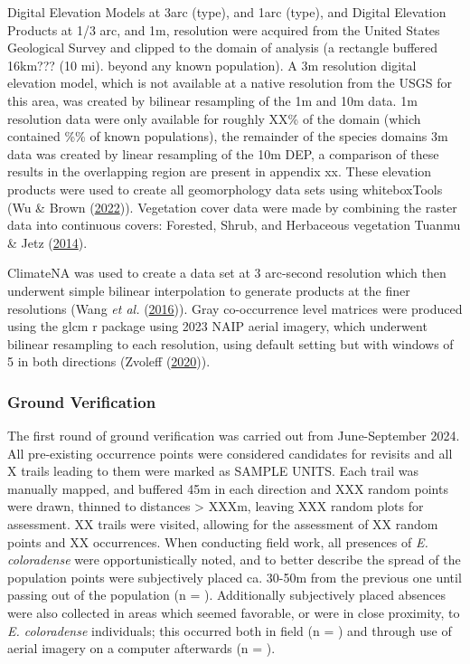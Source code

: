\documentclass[
]{article}
\begin{document}
Digital Elevation Models at 3arc (type), and 1arc (type), and Digital
Elevation Products at 1/3 arc, and 1m, resolution were acquired from the
United States Geological Survey and clipped to the domain of analysis (a
rectangle buffered 16km??? (10 mi). beyond any known population). A 3m
resolution digital elevation model, which is not available at a native
resolution from the USGS for this area, was created by bilinear
resampling of the 1m and 10m data. 1m resolution data were only
available for roughly XX\% of the domain (which contained \%\% of known
populations), the remainder of the species domains 3m data was created
by linear resampling of the 10m DEP, a comparison of these results in
the overlapping region are present in appendix xx. These elevation
products were used to create all geomorphology data sets using
whiteboxTools (Wu \& Brown
(\protect\hyperlink{ref-wu2022whitebox}{2022})). Vegetation cover data
were made by combining the raster data into continuous covers: Forested,
Shrub, and Herbaceous vegetation Tuanmu \& Jetz
(\protect\hyperlink{ref-tuanmu2014global}{2014}).

ClimateNA was used to create a data set at 3 arc-second resolution which
then underwent simple bilinear interpolation to generate products at the
finer resolutions (Wang \emph{et al.}
(\protect\hyperlink{ref-wang2016locally}{2016})). Gray co-occurrence
level matrices were produced using the glcm r package using 2023 NAIP
aerial imagery, which underwent bilinear resampling to each resolution,
using default setting but with windows of 5 in both directions (Zvoleff
(\protect\hyperlink{ref-zvoleff2020glcm}{2020})).

\hypertarget{ground-verification}{%
\subsubsection{Ground Verification}\label{ground-verification}}

The first round of ground verification was carried out from
June-September 2024. All pre-existing occurrence points were considered
candidates for revisits and all X trails leading to them were marked as
SAMPLE UNITS. Each trail was manually mapped, and buffered 45m in each
direction and XXX random points were drawn, thinned to distances
\textgreater{} XXXm, leaving XXX random plots for assessment. XX trails
were visited, allowing for the assessment of XX random points and XX
occurrences. When conducting field work, all presences of \emph{E.
coloradense} were opportunistically noted, and to better describe the
spread of the population points were subjectively placed ca. 30-50m from
the previous one until passing out of the population (n = ).
Additionally subjectively placed absences were also collected in areas
which seemed favorable, or were in close proximity, to \emph{E.
coloradense} individuals; this occurred both in field (n = ) and through
use of aerial imagery on a computer afterwards (n = ).
\end{document}
